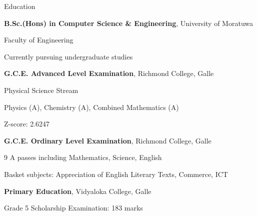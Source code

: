 \begin{rubric}{Education}

\entry*[2023 -- 2027]%
    \textbf{B.Sc.(Hons) in Computer Science \& Engineering}, University of Moratuwa
    \par Faculty of Engineering
    \par Currently pursuing undergraduate studies

\entry*[2022]%
    \textbf{G.C.E. Advanced Level Examination}, Richmond College, Galle
    \par Physical Science Stream
    \par Physics (A), Chemistry (A), Combined Mathematics (A)
    \par Z-score: 2.6247

\entry*[2019]%
    \textbf{G.C.E. Ordinary Level Examination}, Richmond College, Galle
    \par 9 A passes including Mathematics, Science, English
    \par Basket subjects: Appreciation of English Literary Texts, Commerce, ICT

\entry*[Until 2013]%
    \textbf{Primary Education}, Vidyaloka College, Galle
    \par Grade 5 Scholarship Examination: 183 marks

\end{rubric}